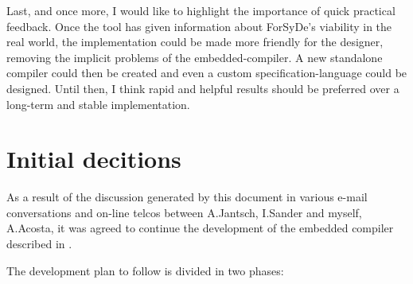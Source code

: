 \documentclass[a4paper,twoside,11pt]{article}
\begin{document}
Last, and once more, I would like to highlight the importance of quick
practical feedback. Once the tool has given information about ForSyDe's
viability in the real world, the implementation could be made more friendly
for the designer, removing the implicit problems of the embedded-compiler. A
new standalone compiler could then be created and even a custom
specification-language could be designed. Until then, I think rapid and
helpful results should be preferred over a long-term and stable
implementation.

\appendix

\section{Initial decitions}

As a result of the discussion generated by this document in various e-mail
conversations and on-line telcos between A.Jantsch, I.Sander and myself,
A.Acosta, it was agreed to continue the development of the embedded compiler
described in \cite{forsyde:synthesis}.

The development plan to follow is divided in two phases:
\end{document}

